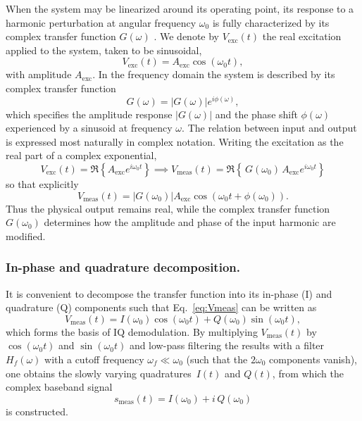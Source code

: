 When the system may be linearized around its operating point, its response to a harmonic perturbation at angular frequency $\omega_0$ is fully characterized by its complex transfer function $G(\omega)$ \cite{feedback_physicists}. We denote by $V_{\mathrm{exc}}(t)$ the real excitation applied to the system, taken to be sinusoidal,
\begin{equation}
V_{\mathrm{exc}}(t) = A_{\mathrm{exc}} \cos(\omega_0 t),
\label{eq:Vexc}
\end{equation}
with amplitude $A_{\mathrm{exc}}$.  
In the frequency domain the system is described by its complex transfer function
\begin{equation}
G(\omega) = |G(\omega)| e^{i\phi(\omega)},
\label{eq:Gomega}
\end{equation}
which specifies the amplitude response $|G(\omega)|$ and the phase shift $\phi(\omega)$ experienced by a sinusoid at frequency $\omega$. The relation between input and output is expressed most naturally in complex notation.  
Writing the excitation as the real part of a complex exponential,
\[
V_{\mathrm{exc}}(t)= \Re\!\left\{A_{\mathrm{exc}} e^{i\omega_0 t}\right\} \implies V_{\mathrm{meas}}(t)
= \Re\!\left\{\, G(\omega_0)\, A_{\mathrm{exc}} e^{i\omega_0 t} \right\}
\]
so that explicitly
\begin{equation}
V_{\mathrm{meas}}(t)
= |G(\omega_0)| A_{\mathrm{exc}}
  \cos\!\left(\omega_0 t + \phi(\omega_0)\right).
\label{eq:Vmeas}
\end{equation}
Thus the physical output remains real, while the complex transfer function $G(\omega_0)$ determines how the amplitude and phase of the input harmonic are modified.

\subsubsection{In-phase and quadrature decomposition.}
It is convenient to decompose the transfer function into its in-phase (I) and quadrature (Q) components such that Eq.~\eqref{eq:Vmeas} can be written as
\begin{equation}
V_{\mathrm{meas}}(t)
= I(\omega_0)\cos(\omega_0 t)
  + Q(\omega_0)\sin(\omega_0 t),
\label{eq:IQreal}
\end{equation}
which forms the basis of IQ demodulation.  
By multiplying $V_{\mathrm{meas}}(t)$ by $\cos(\omega_0 t)$ and $\sin(\omega_0 t)$ and low-pass filtering the results with a filter $H_f(\omega)$ with a cutoff frequency $\omega_f \ll \omega_0$ (such that the $2\omega_0$ components vanish), one obtains the slowly varying quadratures
$\,I(t)$ and $Q(t)$, from which the complex baseband signal
\begin{equation}
s_{\mathrm{meas}}(t) = I(\omega_0) + i\,Q(\omega_0)
\end{equation}
is constructed.  \\  


